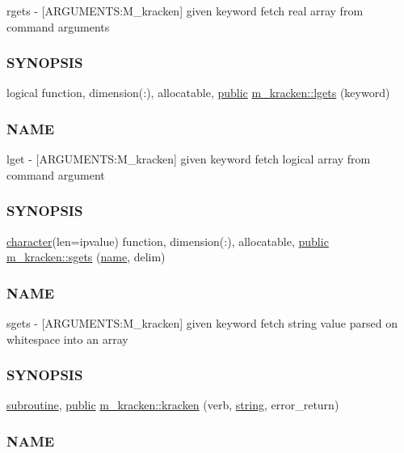 \begin{DoxyCompactItemize}
\begin{DoxyCompactList}
rgets -\/ \mbox{[}A\+R\+G\+U\+M\+E\+N\+TS\+:M\+\_\+kracken\mbox{]} given keyword fetch real array from command arguments \subsubsection*{S\+Y\+N\+O\+P\+S\+IS}\end{DoxyCompactList}\item 
logical function, dimension(\+:), allocatable, \hyperlink{M__stopwatch_83_8txt_a2f74811300c361e53b430611a7d1769f}{public} \hyperlink{namespacem__kracken_afb3f3b45b78625758818ea9bef463fd9}{m\+\_\+kracken\+::lgets} (keyword)
\begin{DoxyCompactList}\small\item\em \subsubsection*{N\+A\+ME}

lget -\/ \mbox{[}A\+R\+G\+U\+M\+E\+N\+TS\+:M\+\_\+kracken\mbox{]} given keyword fetch logical array from command argument \subsubsection*{S\+Y\+N\+O\+P\+S\+IS}\end{DoxyCompactList}\item 
\hyperlink{option__stopwatch_83_8txt_abd4b21fbbd175834027b5224bfe97e66}{character}(len=ipvalue) function, dimension(\+:), allocatable, \hyperlink{M__stopwatch_83_8txt_a2f74811300c361e53b430611a7d1769f}{public} \hyperlink{namespacem__kracken_a8ae60c1a9c903c8ad06ef1f95975d457}{m\+\_\+kracken\+::sgets} (\hyperlink{M__stopwatch_83_8txt_a3f508a893ae4c3b397b4383e33b9bcae}{name}, delim)
\begin{DoxyCompactList}\small\item\em \subsubsection*{N\+A\+ME}

sgets -\/ \mbox{[}A\+R\+G\+U\+M\+E\+N\+TS\+:M\+\_\+kracken\mbox{]} given keyword fetch string value parsed on whitespace into an array \subsubsection*{S\+Y\+N\+O\+P\+S\+IS}\end{DoxyCompactList}\item 
\hyperlink{M__stopwatch_83_8txt_acfbcff50169d691ff02d4a123ed70482}{subroutine}, \hyperlink{M__stopwatch_83_8txt_a2f74811300c361e53b430611a7d1769f}{public} \hyperlink{namespacem__kracken_a850dce381e1cfe18a4ebcaa214995e39}{m\+\_\+kracken\+::kracken} (verb, \hyperlink{what__overview_81_8txt_a74cb7e955273b9f9157b4f0c18a38849}{string}, error\+\_\+return)
\begin{DoxyCompactList}\small\item\em \subsubsection*{N\+A\+ME}


\end{DoxyCompactList}
\end{DoxyCompactItemize}
